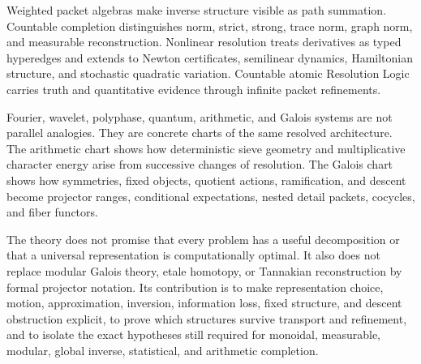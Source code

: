 \documentclass{aomart}
\theoremstyle{definition}
\theoremstyle{remark}
\begin{document}
Weighted packet algebras make inverse structure visible as path summation. Countable completion distinguishes norm, strict, strong, trace norm, graph norm, and measurable reconstruction. Nonlinear resolution treats derivatives as typed hyperedges and extends to Newton certificates, semilinear dynamics, Hamiltonian structure, and stochastic quadratic variation. Countable atomic Resolution Logic carries truth and quantitative evidence through infinite packet refinements.

Fourier, wavelet, polyphase, quantum, arithmetic, and Galois systems are not parallel analogies. They are concrete charts of the same resolved architecture. The arithmetic chart shows how deterministic sieve geometry and multiplicative character energy arise from successive changes of resolution. The Galois chart shows how symmetries, fixed objects, quotient actions, ramification, and descent become projector ranges, conditional expectations, nested detail packets, cocycles, and fiber functors.

The theory does not promise that every problem has a useful decomposition or that a universal representation is computationally optimal. It also does not replace modular Galois theory, etale homotopy, or Tannakian reconstruction by formal projector notation. Its contribution is to make representation choice, motion, approximation, inversion, information loss, fixed structure, and descent obstruction explicit, to prove which structures survive transport and refinement, and to isolate the exact hypotheses still required for monoidal, measurable, modular, global inverse, statistical, and arithmetic completion.
\end{document}
